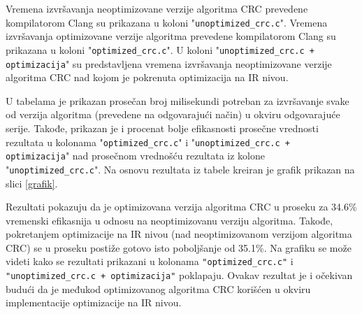 \documentclass[12pt,oneside]{memoir}
\begin{document}
Vremena izvršavanja neoptimizovane verzije algoritma CRC prevedene kompilatorom Clang su prikazana u koloni "\texttt{unoptimized\_crc.c}". Vremena izvršavanja optimizovane verzije algoritma prevedene kompilatorom Clang su prikazana u koloni "\texttt{optimized\_crc.c}". U koloni "\texttt{unoptimized\_crc.c + optimizacija}" su predstavljena vremena izvršavanja neoptimizovane verzije algoritma CRC nad kojom je pokrenuta optimizacija na IR nivou.

U tabelama je prikazan prosečan broj milisekundi potreban za izvršavanje svake od verzija algoritma (prevedene na odgovarajući način) u okviru odgovarajuće serije. Takođe, prikazan je i procenat bolje efikasnosti prosečne vrednosti rezultata u kolonama "\texttt{optimized\_crc.c}" i "\texttt{unoptimized\_crc.c + optimizacija}" nad prosečnom vrednošću rezultata iz kolone "\texttt{unoptimized\_crc.c}". Na osnovu rezultata iz tabele kreiran je grafik prikazan na slici \ref{grafik}.

Rezultati pokazuju da je optimizovana verzija algoritma CRC u proseku za 34.6\% vremenski efikasnija u odnosu na neoptimizovanu verziju algoritma. Takođe, pokretanjem optimizacije na IR nivou (nad neoptimizovanom verzijom algoritma CRC) se u proseku postiže gotovo isto poboljšanje od 35.1\%. Na grafiku se može videti kako se rezultati prikazani u kolonama \texttt{"optimized\_crc.c"} i \texttt{"unoptimized\_crc.c + optimizacija"} poklapaju. Ovakav rezultat je i očekivan budući da je međukod optimizovanog algoritma CRC korišćen u okviru implementacije optimizacije na IR nivou.

 
\end{document}

